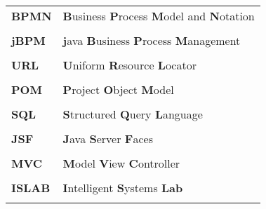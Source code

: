 \documentclass[a4paper, 12pt, oneside]{Thesis}  %
\begin{document}
\begin{table}[!h]
\begin{tabular}{ll}
	\textbf{BPMN}	& \textbf{B}usiness \textbf{P}rocess  \textbf{M}odel and \textbf{N}otation	 \\ \\
	\textbf{jBPM}	& \textbf{j}ava  \textbf{B}usiness \textbf{P}rocess \textbf{M}anagement	
 \\ \\
	\textbf{URL}	& \textbf{U}niform \textbf{R}esource  \textbf{L}ocator  \\ \\
	\textbf{POM}	& \textbf{P}roject \textbf{O}bject  \textbf{M}odel  \\ \\
	\textbf{SQL}	& \textbf{S}tructured \textbf{Q}uery  \textbf{L}anguage  \\ \\
	\textbf{JSF}	& \textbf{J}ava \textbf{S}erver  \textbf{F}aces  \\ \\
	\textbf{MVC}	& \textbf{M}odel \textbf{V}iew  \textbf{C}ontroller  \\ \\			      	\textbf{ISLAB}	& \textbf{I}ntelligent \textbf{S}ystems  \textbf{Lab}  \\ \\
\end{tabular}
\end{table}






\pagestyle{empty}  %




\mainmatter	  %
\lhead[\rm\thepage]{\fancyplain{}{\sl{\rightmark}}}
\pagestyle{fancy}  %



 
\end{document}
